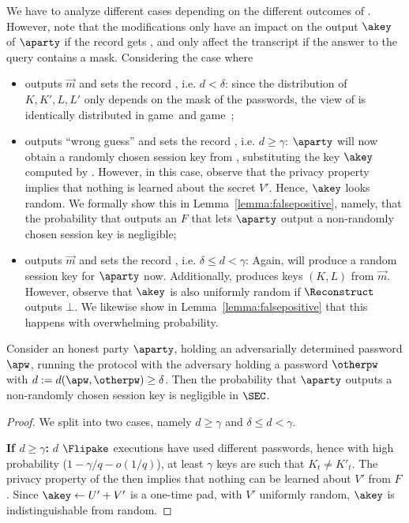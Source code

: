 \begin{games}
We have to analyze different cases depending on the different outcomes of \TestPwd. 
However, note that the modifications only have an impact on the output $\akey$ of $\aparty$ if the record gets , and only affect the transcript if the answer to the \TestPwd query contains a mask. Considering the case where \TestPwd
\begin{itemize}
	\item outputs $\vec{m}$ and sets the record , i.e. $d<\delta$: since the distribution of $K,K',L,L'$ only depends on the mask of the passwords, the view of \Env is identically distributed in game~\thisgame and game~\previousgame;
\item outputs ``wrong guess'' and sets the record , i.e. $d\geq \gamma$: $\aparty$ will now obtain a randomly chosen session key from \Func, substituting the key $\akey$ computed by \Sim.
	However, in this case, observe that the privacy property implies that nothing is learned about the secret $V'$. Hence, $\akey$ looks random.
	We formally show this in Lemma~\ref{lemma:falsepositive}, namely, that the probability that \Env outputs an $F$ that lets $\aparty$ output a non-randomly chosen session key is negligible;
\item outputs $\vec{m}$ and sets the record , i.e. $\delta \leq d<\gamma$: Again, \Func will produce a random session key for $\aparty$ now. Additionally, \Sim produces keys $(K,L)$ from $\vec{m}$.
	However, observe that $\akey$ is also uniformly random if $\Reconstruct$ outputs $\bot$.
	We likewise show in Lemma~\ref{lemma:falsepositive} that this happens with overwhelming probability.
\end{itemize}
 
\begin{lemma}\label{lemma:falsepositive}
 Consider an honest party $\aparty$, holding an adversarially determined password $\apw$, running the protocol with the adversary holding a password $\otherpw$ with $d:=d(\apw,\otherpw)\geq \delta$. Then the probability that $\aparty$ outputs a non-randomly chosen session key is negligible in $\SEC$.
\end{lemma}
\begin{proof}
We split into two cases, namely $d\geq\gamma$ and $\delta\leq d<\gamma$.

\textbf{If $d\geq\gamma$:}
$d$ $\Flipake$ executions have used different passwords, hence with high probability ($1-\gamma/q-o(1/q)$), at least $\gamma$ keys are such that $K_t \neq K'_t$.
The privacy property of the \WRSS then implies that nothing can be learned about $V'$ from $F$.
Since $\akey\gets U' + V'$ is a one-time pad, with $V'$ uniformly random, $\akey$ is indistinguishable from random.


\end{proof}
\end{games}
